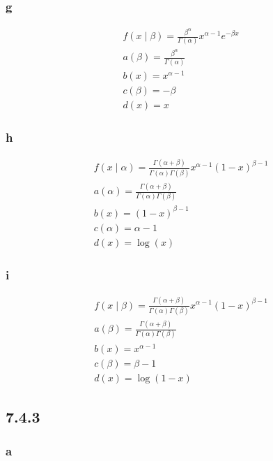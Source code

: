 \documentclass[12pt,letterpaper]{article}
\theoremstyle{definition}
\begin{document}
\subsubsection*{g}

\begin{gather*}
  f(x \mid \beta) = \frac{\beta^\alpha}{\Gamma(\alpha)}x^{\alpha -1}e^{-\beta x}
  \\ 
  a(\beta) = \frac{\beta^\alpha}{\Gamma(\alpha)} \\
  b(x) = x^{\alpha - 1} \\
  c(\beta) = -\beta \\
  d(x) = x
\end{gather*}

\subsubsection*{h}

\begin{gather*}
  f(x \mid \alpha) = \frac{\Gamma(\alpha +
    \beta)}{\Gamma(\alpha)\Gamma(\beta)}x^{\alpha-1}(1-x)^{\beta - 1} \\
  a(\alpha) = \frac{\Gamma(\alpha + \beta)}{\Gamma(\alpha)\Gamma(\beta)} \\
  b(x) = (1-x)^{\beta - 1} \\
  c(\alpha) = \alpha - 1 \\
  d(x) = \log(x)
\end{gather*}

\subsubsection*{i}

\begin{gather*}
  f(x \mid \beta) = \frac{\Gamma(\alpha +
    \beta)}{\Gamma(\alpha)\Gamma(\beta)}x^{\alpha-1}(1-x)^{\beta - 1} \\
  a(\beta) = \frac{\Gamma(\alpha + \beta)}{\Gamma(\alpha)\Gamma(\beta)} \\
  b(x) = x^{\alpha - 1} \\
  c(\beta) = \beta - 1 \\
  d(x) = \log(1-x)
\end{gather*}


\subsection*{7.4.3}

\subsubsection*{a}
\end{document}
